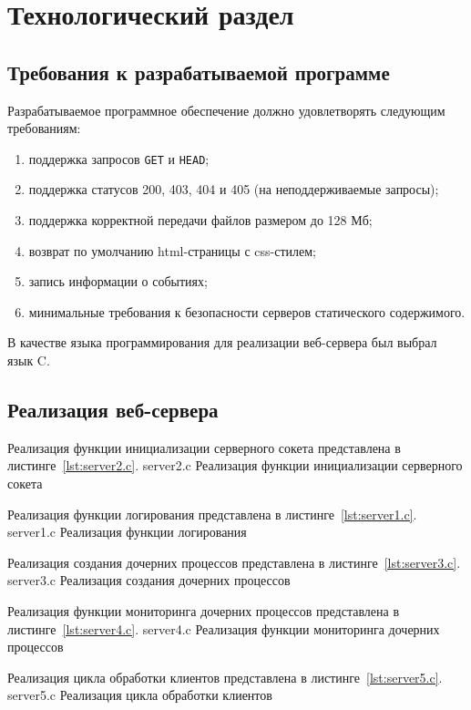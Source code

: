 \chapter{Технологический раздел}

\section{Требования к разрабатываемой программе}

Разрабатываемое программное обеспечение должно удовлетворять следующим требованиям:
\begin{enumerate}[leftmargin=1.6\parindent]
	\item поддержка запросов \texttt{GET} и \texttt{HEAD};
	\item поддержка статусов 200, 403, 404 и 405 (на неподдерживаемые запросы);
	\item поддержка корректной передачи файлов размером до 128 Мб;
	\item возврат по умолчанию html-страницы с css-стилем;
	\item запись информации о событиях;
	\item минимальные требования к безопасности серверов статического содержимого.
\end{enumerate}

В качестве языка программирования для реализации веб-сервера был выбрал язык C.

\clearpage
\section{Реализация веб-сервера}

Реализация функции инициализации серверного сокета представлена в листинге~\ref{lst:server2.c}.
	{server2.c}
	{Реализация функции инициализации серверного сокета}
\clearpage

Реализация функции логирования представлена в листинге~\ref{lst:server1.c}.
	{server1.c}
	{Реализация функции логирования}


Реализация создания дочерних процессов представлена в листинге~\ref{lst:server3.c}.
	{server3.c}
	{Реализация создания дочерних процессов}
\clearpage

Реализация функции мониторинга дочерних процессов представлена в листинге~\ref{lst:server4.c}.
	{server4.c}
	{Реализация функции мониторинга дочерних процессов}
\clearpage

Реализация цикла обработки клиентов представлена в листинге~\ref{lst:server5.c}.
	{server5.c}
	{Реализация цикла обработки клиентов}
\clearpage

